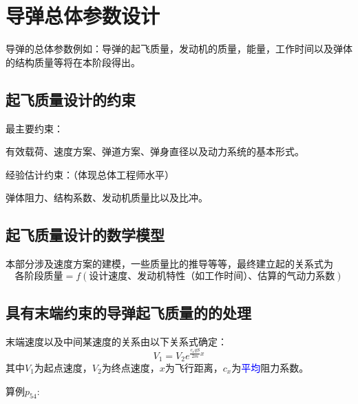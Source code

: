\chapter{导弹总体参数设计}
导弹的总体参数例如：导弹的起飞质量，发动机的质量，能量，工作时间以及弹体的结构质量等将在本阶段得出。
\section{起飞质量设计的约束}
{\heiti 最主要约束：}

有效载荷、速度方案、弹道方案、弹身直径以及动力系统的基本形式。

{\heiti 经验估计约束：（体现总体工程师水平）}

弹体阻力、结构系数、发动机质量比以及比冲。
\section{起飞质量设计的数学模型}
本部分涉及速度方案的建模，一些质量比的推导等等，最终建立起的关系式为$$\mbox{各阶段质量} = f(\mbox{设计速度、发动机特性（如工作时间）、估算的气动力系数})$$
\section{具有末端约束的导弹起飞质量的的处理}
末端速度以及中间某速度的关系由以下关系式确定：
$$V_1 = V_2e^{\frac{c_xqS}{2m}x}$$
其中$V_1$为起点速度，$V_2$为终点速度，$x$为飞行距离，$c_x$为\textcolor{blue}{平均}阻力系数。

{\kaishu 算例$p_{54}$:}
